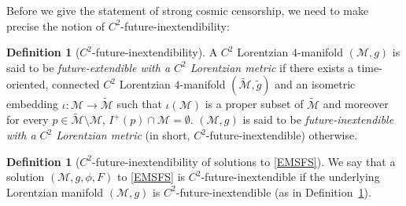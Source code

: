\documentclass[10pt, reqno]{amsart}
\theoremstyle{definition}
\newtheorem{definition}[theorem]{Definition}
\theoremstyle{remark}
\numberwithin{equation}{section}
\newcommand{\0}{\emptyset}
\begin{document}
Before we give the statement of strong cosmic censorship, we need to make precise the notion of $C^2$-future-inextendibility:
\begin{definition}[$C^2$-future-inextendibility]\label{def.FE}
A $C^{2}$ Lorentzian $4$-manifold $(\mathcal M,g)$ is said to be \emph{future-extendible with a $C^2$ Lorentzian metric} if there exists a time-oriented, connected $C^2$ Lorentzian $4$-manifold $(\widetilde{\mathcal M}, \tilde{g})$ and an isometric embedding $\iota: \mathcal M\to \widetilde{\mathcal M}$ such that $\iota(\mathcal M)$ is a proper subset of $\widetilde{\mathcal M}$ and moreover for every $p\in \widetilde{\mathcal M}\setminus \mathcal M$, $I^+(p)\cap \mathcal M=\emptyset$. $(\mathcal M,g)$ is said to be \emph{future-inextendible with a $C^2$ Lorentzian metric} (in short, $C^2$-future-inextendible) otherwise.
\end{definition}

\begin{definition}[$C^2$-future-inextendibility of solutions to \eqref{EMSFS}] We say that a solution $(\mathcal M, g, \phi, F)$ to \eqref{EMSFS} is $C^2$-future-inextendible if the underlying Lorentzian manifold $(\mathcal M, g)$ is $C^2$-future-inextendible (as in Definition~\ref{def.FE}).
\end{definition}
\end{document}
